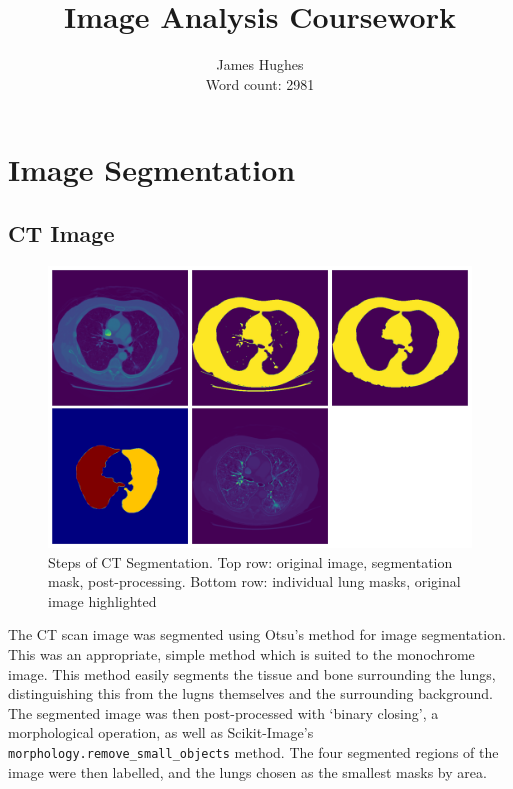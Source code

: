 \documentclass[12pt]{article}
\title{\textbf{Image Analysis Coursework}}
\author{James Hughes\\ Word count: 2981}
\begin{document}
\maketitle

\newpage

\tableofcontents

\newpage

\section{Image Segmentation}

\subsection{CT Image}

\begin{figure}[htp]
    \includegraphics[scale=0.35, center]{figures/ct_segmentation.png}
    \caption{Steps of CT Segmentation. Top row: original image, segmentation mask, post-processing. Bottom row: individual lung masks, original image highlighted}
    \label{fig:ct}
\end{figure}

The CT scan image was segmented using Otsu's method for image segmentation.
This was an appropriate, simple method which is suited to the monochrome image.
This method easily segments the tissue and bone surrounding the lungs,
distinguishing this from the lugns themselves and the surrounding background.
The segmented image was then post-processed with `binary closing', a morphological operation,
as well as Scikit-Image's \texttt{morphology.remove\_small\_objects} method.
The four segmented regions of the image were then labelled, and the lungs chosen as the smallest masks by area.
\end{document}
